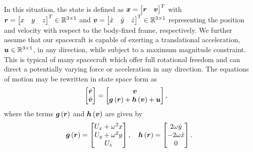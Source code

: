 \documentclass[]{aiaa-tc}%
\begin{document}
In this situation, the state is defined as \( \bm{x} = \begin{bmatrix}\bm{r} &\bm{v} \end{bmatrix}^T\) with \(\bm{r} = \begin{bmatrix} x & y & z \end{bmatrix}^T \in \mathbb{R}^{3\times1}\) and \(\bm{v}= \begin{bmatrix} \dot{x} & \dot{y} & \dot{z} \end{bmatrix}^T \in \mathbb{R}^{3\times1}\) representing the position and velocity with respect to the body-fixed frame, respectively.
We further assume that our spacecraft is capable of exerting a translational acceleration, \( \bm{u} \in \mathbb{R}^{3\times1} \), in any direction, while subject to a maximum magnitude constraint.
This is typical of many spacecraft which offer full rotational freedom and can direct a potentially varying force or acceleration in any direction.
The equations of motion may be rewritten in state space form as
\begin{align}\label{eq:state_space_eoms}
    \begin{bmatrix} \dot{\bm{r}} \\ \dot{\bm{v}} \end{bmatrix} &=
    \begin{bmatrix}\bm{v} \\ \bm{g} \left( \bm{r} \right) + \bm{h}\left( \bm{v} \right) + \bm{u} \end{bmatrix} ,
\end{align}
where the terms \(\bm{g} \left( \bm{r} \right) \) and \( \bm{h}\left( \bm{v} \right) \) are given by
\begin{align}\label{eq:state_space_terms}
    \bm{g}\left( \bm{r} \right) = \begin{bmatrix}  U_x + \omega^2 x \\ U_y + \omega^2 y \\ U_z \end{bmatrix} ,\quad
    \bm{h}\left( \bm{r} \right) = \begin{bmatrix} 2 \omega \dot{y} \\ -2 \omega \dot{x} \\ 0 \end{bmatrix} .
\end{align}
\end{document}
